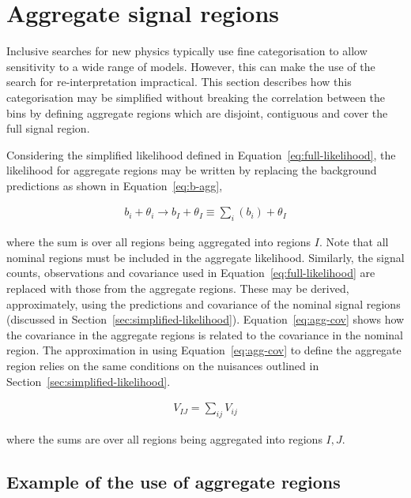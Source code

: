 \section{Aggregate signal regions}
\label{sec:aggregate-signal-regions}

Inclusive searches for new physics typically use fine categorisation to allow
sensitivity to a wide range of models. However, this can make the use
of the search for re-interpretation impractical. 
This section describes how this categorisation may be simplified without breaking the correlation 
between the bins by defining aggregate regions which are disjoint, 
contiguous and cover the full signal region.

Considering the simplified likelihood defined in Equation~\ref{eq:full-likelihood},
the likelihood for aggregate regions may be written by replacing the 
background predictions as shown in Equation~\ref{eq:b-agg},

\begin{align}
b_{i} + \theta_i \rightarrow b_I + \theta_I \equiv \sum_{i}(b_{i}) + \theta_I
\label{eq:b-agg}
\end{align}

where the sum is over all regions being aggregated into regions $I$.
Note that all nominal regions must be included in the aggregate likelihood.
Similarly, the signal counts, observations and covariance used in Equation~\ref{eq:full-likelihood} are
replaced with those from the aggregate regions. These may be derived, approximately, using the predictions and covariance
of the nominal signal regions (discussed in Section~\ref{sec:simplified-likelihood}).
Equation~\ref{eq:agg-cov} shows how the covariance in the aggregate
regions is related to the covariance in the nominal region. The approximation in using Equation~\ref{eq:agg-cov} to 
define the aggregate region relies on the same conditions 
on the nuisances outlined in Section~\ref{sec:simplified-likelihood}. 

\begin{align}
V_{IJ}=\sum_{ij}V_{ij}
\label{eq:agg-cov}
\end{align}

where the sums are over all regions being aggregated into regions $I,J$. 

\subsection{Example of the use of aggregate regions}
\label{sec:agg-toy}

